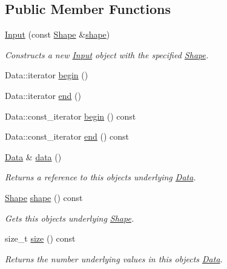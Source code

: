 \subsection*{Public Member Functions}
\begin{DoxyCompactItemize}
\item 
\hyperlink{classmarian_1_1data_1_1Input_afe8ea48efed6b608c6ba3fcbe6b98111}{Input} (const \hyperlink{structmarian_1_1Shape}{Shape} \&\hyperlink{classmarian_1_1data_1_1Input_acd8a1b8df6caa0bbfb13a524277852e3}{shape})
\begin{DoxyCompactList}\small\item\em Constructs a new \hyperlink{classmarian_1_1data_1_1Input}{Input} object with the specified \hyperlink{structmarian_1_1Shape}{Shape}. \end{DoxyCompactList}\item 
Data\+::iterator \hyperlink{classmarian_1_1data_1_1Input_a7fe7b6ad7903bb7bc82572ff42627cfd}{begin} ()
\item 
Data\+::iterator \hyperlink{classmarian_1_1data_1_1Input_a9dd6844703031ebe5a021d3b3362bd30}{end} ()
\item 
Data\+::const\+\_\+iterator \hyperlink{classmarian_1_1data_1_1Input_a5cc55ae3f354855e74e375bb259370b1}{begin} () const 
\item 
Data\+::const\+\_\+iterator \hyperlink{classmarian_1_1data_1_1Input_abe996d8b0e1d2db673b5e15ced03abdd}{end} () const 
\item 
\hyperlink{namespacemarian_1_1data_a5801e80ecb76ee38a5ac080f08d9646c}{Data} \& \hyperlink{classmarian_1_1data_1_1Input_a4ab2dc585e463b4dab0e822b2108b977}{data} ()
\begin{DoxyCompactList}\small\item\em Returns a reference to this object\textquotesingle{}s underlying \hyperlink{namespacemarian_1_1data_a5801e80ecb76ee38a5ac080f08d9646c}{Data}. \end{DoxyCompactList}\item 
\hyperlink{structmarian_1_1Shape}{Shape} \hyperlink{classmarian_1_1data_1_1Input_acd8a1b8df6caa0bbfb13a524277852e3}{shape} () const 
\begin{DoxyCompactList}\small\item\em Gets this object\textquotesingle{}s underlying \hyperlink{structmarian_1_1Shape}{Shape}. \end{DoxyCompactList}\item 
size\+\_\+t \hyperlink{classmarian_1_1data_1_1Input_aef48296cf6749c641f229568a95bd4ee}{size} () const 
\begin{DoxyCompactList}\small\item\em Returns the number underlying values in this object\textquotesingle{}s \hyperlink{namespacemarian_1_1data_a5801e80ecb76ee38a5ac080f08d9646c}{Data}. \end{DoxyCompactList}\end{DoxyCompactItemize}

